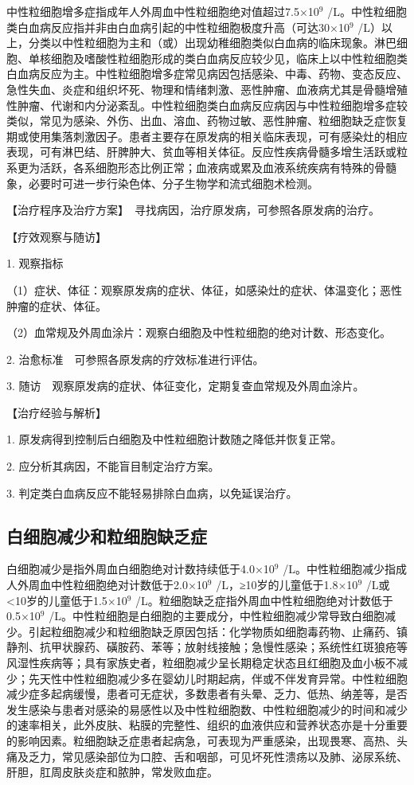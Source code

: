 中性粒细胞增多症指成年人外周血中性粒细胞绝对值超过7.5×10$^{9}$
/L。中性粒细胞类白血病反应指并非由白血病引起的中性粒细胞极度升高（可达30×10$^{9}$
/L）以上，分类以中性粒细胞为主和（或）出现幼稚细胞类似白血病的临床现象。淋巴细胞、单核细胞及嗜酸性粒细胞形成的类白血病反应较少见，临床上以中性粒细胞类白血病反应为主。中性粒细胞增多症常见病因包括感染、中毒、药物、变态反应、急性失血、炎症和组织坏死、物理和情绪刺激、恶性肿瘤、血液病尤其是骨髓增殖性肿瘤、代谢和内分泌紊乱。中性粒细胞类白血病反应病因与中性粒细胞增多症较类似，常见为感染、外伤、出血、溶血、药物过敏、恶性肿瘤、粒细胞缺乏症恢复期或使用集落刺激因子。患者主要存在原发病的相关临床表现，可有感染灶的相应表现，可有淋巴结、肝脾肿大、贫血等相关体征。反应性疾病骨髓多增生活跃或粒系更为活跃，各系细胞形态比例正常；血液病或累及血液系统疾病有特殊的骨髓象，必要时可进一步行染色体、分子生物学和流式细胞术检测。

【治疗程序及治疗方案】　寻找病因，治疗原发病，可参照各原发病的治疗。

【疗效观察与随访】

1. 观察指标

（1）症状、体征：观察原发病的症状、体征，如感染灶的症状、体温变化；恶性肿瘤的症状、体征。

（2）血常规及外周血涂片：观察白细胞及中性粒细胞的绝对计数、形态变化。

2. 治愈标准　可参照各原发病的疗效标准进行评估。

3. 随访　观察原发病的症状、体征变化，定期复查血常规及外周血涂片。

【治疗经验与解析】

1. 原发病得到控制后白细胞及中性粒细胞计数随之降低并恢复正常。

2. 应分析其病因，不能盲目制定治疗方案。

3. 判定类白血病反应不能轻易排除白血病，以免延误治疗。

\subsection{白细胞减少和粒细胞缺乏症}

白细胞减少是指外周血白细胞绝对计数持续低于4.0×10$^{9}$
/L。中性粒细胞减少指成人外周血中性粒细胞绝对计数低于2.0×10$^{9}$
/L，≥10岁的儿童低于1.8×10$^{9}$ /L或<10岁的儿童低于1.5×10$^{9}$
/L。粒细胞缺乏症指外周血中性粒细胞绝对计数低于0.5×10$^{9}$
/L。中性粒细胞是白细胞的主要成分，中性粒细胞减少常导致白细胞减少。引起粒细胞减少和粒细胞缺乏原因包括：化学物质如细胞毒药物、止痛药、镇静剂、抗甲状腺药、磺胺药、苯等；放射线接触；急慢性感染；系统性红斑狼疮等风湿性疾病等；具有家族史者，粒细胞减少呈长期稳定状态且红细胞及血小板不减少；先天性中性粒细胞减少多在婴幼儿时期起病，伴或不伴发育异常。中性粒细胞减少症多起病缓慢，患者可无症状，多数患者有头晕、乏力、低热、纳差等，是否发生感染与患者对感染的易感性以及中性粒细胞数、中性粒细胞减少的时间和减少的速率相关，此外皮肤、粘膜的完整性、组织的血液供应和营养状态亦是十分重要的影响因素。粒细胞缺乏症患者起病急，可表现为严重感染，出现畏寒、高热、头痛及乏力，常见感染部位为口腔、舌和咽部，可见坏死性溃疡以及肺、泌尿系统、肝胆，肛周皮肤炎症和脓肿，常发败血症。

